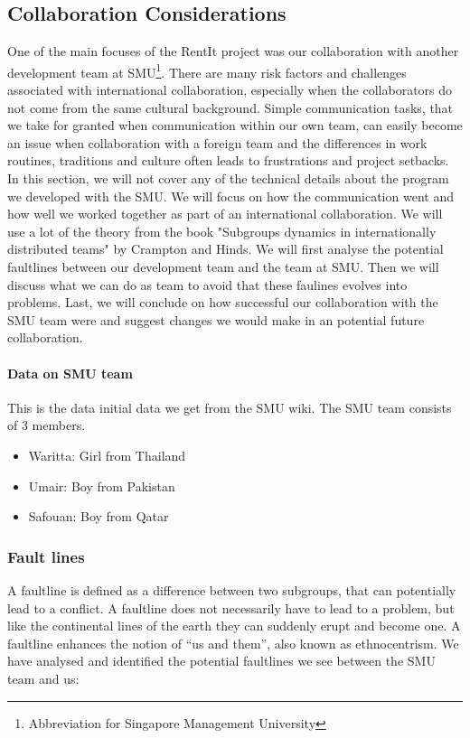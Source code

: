 \documentclass[a4paper,11pt,report]{article}
\begin{document}
\subsection{Collaboration Considerations}
One of the main focuses of the RentIt project was our collaboration with another development team at SMU\footnote{Abbreviation for Singapore Management University}. There are many risk factors and challenges associated with international collaboration, especially when the collaborators do not come from the same cultural background. Simple communication tasks, that we take for granted when communication within our own team, can easily become an issue when collaboration with a foreign team and the differences in work routines, traditions and culture often leads to frustrations and project setbacks. \\

In this section, we will not cover any of the technical details about the program we developed with the SMU. We will focus on how the communication went and how well we worked together as part of an international collaboration. We will use a lot of the theory from the book "Subgroups dynamics in internationally distributed teams" by Crampton and Hinds. We will first analyse the potential faultlines\cite{smu} between our development team and the team at SMU. Then we will discuss what we can do as team to avoid that these faulines evolves into problems. Last, we will conclude on how successful our collaboration with the SMU team were and suggest changes we would make in an potential future collaboration.\\

\paragraph{Data on SMU team}

This is the data initial data we get from the SMU wiki. The SMU team consists of 3 members.\\

\begin{itemize}
\item Waritta: Girl from Thailand
\item Umair: Boy from Pakistan
\item Safouan: Boy from Qatar
\end{itemize}

\subsubsection{Fault lines}
A faultline is defined as a difference between two subgroups, that can potentially lead to a conflict. A faultline does not necessarily have to lead to a problem, but like the continental lines of the earth they can suddenly erupt and become one. A faultline enhances the notion of “us and them”, also known as ethnocentrism\cite{smu}. We have analysed and identified the potential faultlines we see between the SMU team and us:
\end{document}
